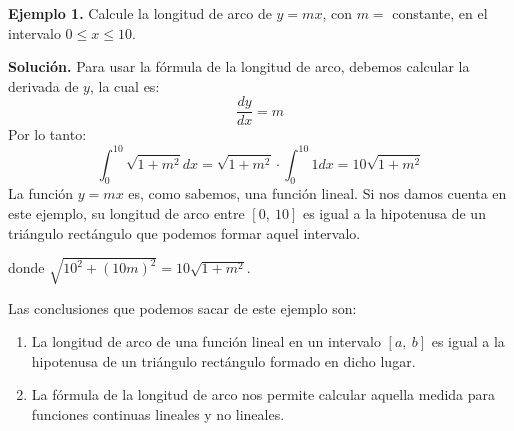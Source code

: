\documentclass[12pt]{article}
\begin{document}
\textbf{Ejemplo 1.} Calcule la longitud de arco de $y = mx$, con $m =$ constante, en el intervalo $0 \leq x \leq 10$.

\textbf{Solución.} Para usar la fórmula de la longitud de arco, debemos calcular la derivada de $y$, la cual es:
\[
  \frac{dy}{dx} = m
\]
Por lo tanto:
\[
  \int_{0}^{10} \sqrt{1 + m^{2}} dx = \sqrt{1 + m^{2}} \cdot \int_{0}^{10} 1 dx = 10 \sqrt{1 + m^{2}}
\]
La función $y = mx$ es, como sabemos, una función lineal. Si nos damos cuenta en este ejemplo, su longitud de arco entre $[0, \ 10]$ es igual a la hipotenusa de un triángulo rectángulo que podemos formar aquel intervalo.

\begin{figure}[hbt!]
\centering


\end{figure}

donde $\sqrt{10^{2} + (10m)^{2}} = 10 \sqrt{1 + m^{2}}$.

Las conclusiones que podemos sacar de este ejemplo son:

\begin{enumerate}
\item La longitud de arco de una función lineal en un intervalo $[a, \ b]$ es igual a la hipotenusa de un triángulo rectángulo formado en dicho lugar.
\item La fórmula de la longitud de arco nos permite calcular aquella medida para funciones continuas lineales y no lineales.
\end{enumerate}
\end{document}
